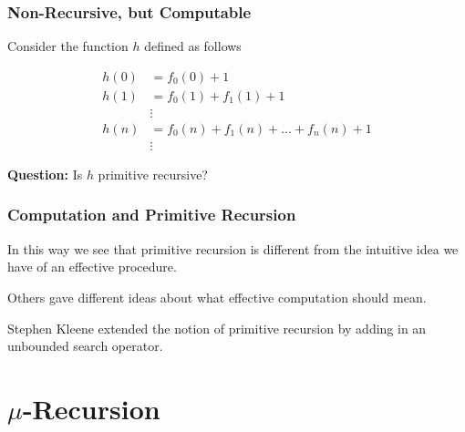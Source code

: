 \documentclass{beamer}
\begin{document}
\begin{frame}
	\frametitle{Non-Recursive, but Computable}

	Consider the function $h$ defined as follows 

	\begin{align*}
		h(0) &= f_{0}(0) + 1 \\
		h(1) &= f_{0}(1) + f_{1}(1) + 1 \\
		&\vdots \\
		h(n) &= f_{0}(n) + f_{1}(n) + \dots + f_{n}(n) + 1 \\
		&\vdots
	\end{align*}

	{\bf Question:} Is $h$ primitive recursive? 

	\vspace{3cm}



\end{frame}

\begin{frame}
	\frametitle{Computation and Primitive Recursion}

	In this way we see that primitive recursion is different from the intuitive idea we have of an effective procedure. 

	\vspace{0.5cm}

	Others gave different ideas about what effective computation should mean. 

	\vspace{0.5cm}

	Stephen Kleene extended the notion of primitive recursion by adding in an unbounded search operator. 


\end{frame}

\section{$\mu$-Recursion}
\end{document}
